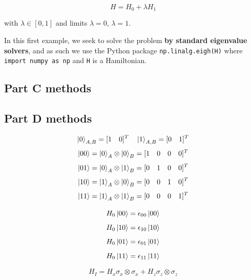 \begin{equation}
    H=H_0+\lambda H_1
\end{equation}

with $\lambda\in[0,1]$ and limits $\lambda=0$, $\lambda=1$.

In this first example, we seek to solve the problem \textbf{by standard eigenvalue solvers}, and as such we use the Python package \texttt{np.linalg.eigh(H)} where \texttt{import numpy as np} and \texttt{H} is a Hamiltonian. 

\subsection{Part C methods}

\subsection{Part D methods}

\begin{equation}
    \left| 0 \right\rangle_{A,B} = [1\quad0]^T \quad \left| 1 \right\rangle_{A,B}=[0\quad1]^T
\end{equation}
\begin{equation}
    \left| 00 \right\rangle=\left| 0 \right\rangle_A\otimes\left| 0 \right\rangle_B=[1\quad0\quad0\quad0]^T
\end{equation}
\begin{equation}
    \left| 01 \right\rangle=\left| 0 \right\rangle_A\otimes\left| 1 \right\rangle_B=[0\quad1\quad0\quad0]^T
\end{equation}
\begin{equation}
    \left| 10 \right\rangle=\left| 1 \right\rangle_A\otimes\left| 0 \right\rangle_B=[0\quad0\quad1\quad0]^T
\end{equation}
\begin{equation}
    \left| 11 \right\rangle=\left| 1 \right\rangle_A\otimes\left| 1 \right\rangle_B=[0\quad0\quad0\quad1]^T
\end{equation}

\begin{equation}
    H_0\left| 00 \right\rangle = \epsilon_{00}\left| 00 \right\rangle
\end{equation}
\begin{equation}
    H_0\left| 10 \right\rangle = \epsilon_{10}\left| 10 \right\rangle
\end{equation}
\begin{equation}
    H_0\left| 01 \right\rangle = \epsilon_{01}\left| 01 \right\rangle
\end{equation}
\begin{equation}
    H_0\left| 11 \right\rangle = \epsilon_{11}\left| 11 \right\rangle
\end{equation}

\begin{equation}
    H_I=H_x\sigma_x\otimes\sigma_x+H_z\sigma_z\otimes\sigma_z
\end{equation}

